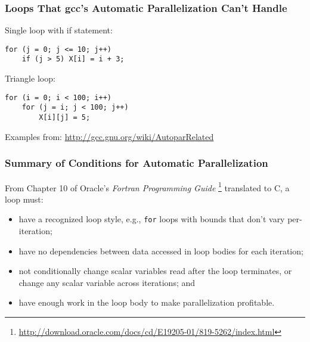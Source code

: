 \documentclass[aspectratio=43]{beamer}
\newenvironment{changemargin}[1]{%
  \begin{list}{}{%
    \setlength{\topsep}{0pt}%
    \setlength{\leftmargin}{#1}%
    \setlength{\rightmargin}{1em}
    \setlength{\listparindent}{\parindent}%
    \setlength{\itemindent}{\parindent}%
    \setlength{\parsep}{\parskip}%
  }%
  \item[]}{\end{list}}
\begin{document}
\begin{frame}[fragile]
  \frametitle{Loops That gcc's Automatic Parallelization Can't Handle}

\begin{changemargin}{2.5cm}
  Single loop with if statement:
  \begin{lstlisting}
for (j = 0; j <= 10; j++)
    if (j > 5) X[i] = i + 3;
  \end{lstlisting}
  \vfill
  Triangle loop:
  \begin{lstlisting}
for (i = 0; i < 100; i++)
    for (j = i; j < 100; j++)
        X[i][j] = 5;
  \end{lstlisting}
  \vfill
  Examples from: \url{http://gcc.gnu.org/wiki/AutoparRelated}
\end{changemargin}
\end{frame}

\begin{frame}
  \frametitle{Summary of Conditions for Automatic Parallelization}

\begin{changemargin}{2.5cm}
  From Chapter 10 of
  Oracle's \emph{Fortran Programming Guide}
  \footnote{\scriptsize \url{http://download.oracle.com/docs/cd/E19205-01/819-5262/index.html}}
  translated to C, a loop must:

  \begin{itemize}
    \item have a recognized loop style, e.g., {\tt for} loops with
      bounds that don't vary per-iteration;
    \item have no dependencies between data accessed in loop bodies for
      each iteration;
    \item not conditionally change scalar variables read after the loop
      terminates, or change any scalar variable across iterations; and
    \item have enough work in the loop body to make parallelization profitable.
  \end{itemize}
\end{changemargin}
\end{frame}
\end{document}
